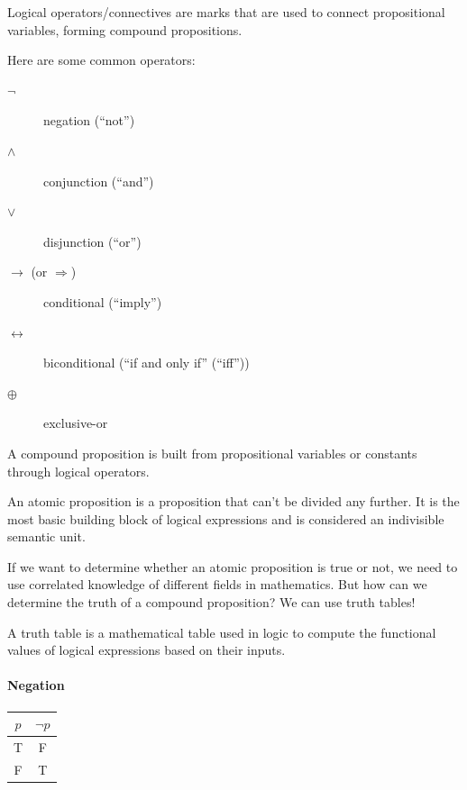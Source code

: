 \documentclass[oneside]{book}
\begin{document}
\begin{definition}
Logical operators/connectives are marks that are used to connect propositional variables, forming compound propositions.
\end{definition}

Here are some common operators:
\begin{description}
    \item[$\neg$] negation (“not”)
    \item[$\wedge$] conjunction (“and”)
    \item[$\vee$] disjunction (“or”)
    \item[$\to$ (or $\Rightarrow$)] conditional (“imply”)
    \item[$\leftrightarrow$] biconditional (“if and only if” (“iff”))
    \item[$\oplus$] exclusive-or
\end{description}

\begin{definition}
A compound proposition is built from propositional variables or constants through logical operators.
\end{definition}

\begin{definition}
An atomic proposition is a proposition that can't be divided any further. It is the most basic building block of logical expressions and is considered an indivisible semantic unit.
\end{definition}

If we want to determine whether an atomic proposition is true or not, we need to use correlated knowledge of different fields in mathematics. But how can we determine the truth of a compound proposition? We can use truth tables!

\begin{definition}
A truth table is a mathematical table used in logic to compute the functional values of logical expressions based on their inputs.
\end{definition}

\paragraph{Negation}
\begin{center}
\begin{tabular}{c|c}
\toprule
$p$ & $\neg p$ \\
\midrule
T & F \\
F & T \\
\bottomrule
\end{tabular}
\end{center}
\end{document}

